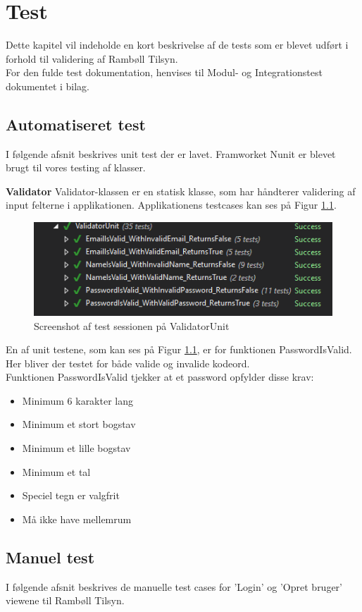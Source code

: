 \chapter{Test}
Dette kapitel vil indeholde en kort beskrivelse af de tests som er blevet udført i forhold til validering af Rambøll Tilsyn. \\
For den fulde test dokumentation, henvises til Modul- og Integrationstest dokumentet i bilag. \\

\section{Automatiseret test}
I følgende afsnit beskrives unit test der er lavet. Framworket Nunit\cite{NUnit} er blevet brugt til vores testing af klasser. 

\textbf{Validator}
Validator-klassen er en statisk klasse, som har håndterer validering af input felterne i applikationen. Applikationens testcases kan ses på Figur \ref{fig:ValidatorUnit}.
\begin{figure}[H]
	\centering
	\includegraphics[width=0.6\linewidth]{Test/ValidatorUnit}
	\caption{Screenshot af test sessionen på ValidatorUnit}
	\label{fig:ValidatorUnit}
\end{figure}

En af unit testene, som kan ses på Figur \ref{fig:ValidatorUnit}, er for funktionen PasswordIsValid. Her bliver der testet for både valide og invalide kodeord.\\
Funktionen PasswordIsValid tjekker at et password opfylder disse krav:
\begin{itemize}
	\item Minimum 6 karakter lang
	\item Minimum et stort bogstav
	\item Minimum et lille bogstav
	\item Minimum et tal
	\item Speciel tegn er valgfrit
	\item Må ikke have mellemrum
\end{itemize}

\clearpage

\section{Manuel test}
I følgende afsnit beskrives de manuelle test cases for 'Login' og 'Opret bruger' viewene til Rambøll Tilsyn.

